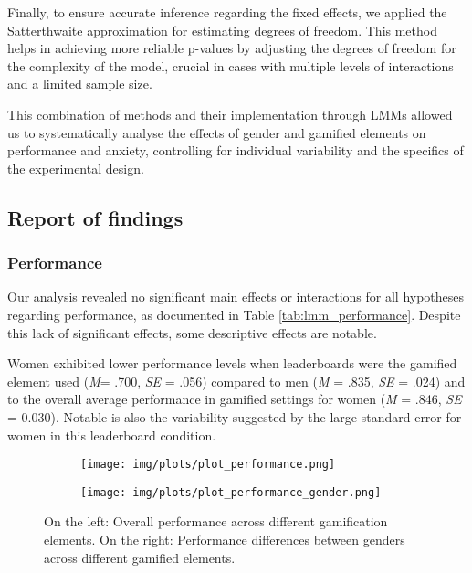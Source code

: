 Finally, to ensure accurate inference regarding the fixed effects, we applied the Satterthwaite approximation for estimating degrees of freedom.
This method helps in achieving more reliable p-values by adjusting the degrees of freedom for the complexity of the model, crucial in cases with multiple levels of interactions and a limited sample size.

This combination of methods and their implementation through LMMs allowed us to systematically analyse the effects of gender and gamified elements on performance and anxiety, controlling for individual variability and the specifics of the experimental design.

\subsection{Report of findings}

\subsubsection{Performance}
Our analysis revealed no significant main effects or interactions for all hypotheses regarding performance, as documented in Table \ref{tab:lmm_performance}.
Despite this lack of significant effects, some descriptive effects are notable.

Women exhibited lower performance levels when leaderboards were the gamified element used (\textit{M}= .700, \textit{SE} = .056) compared to men (\textit{M} = .835, \textit{SE} = .024) and to the overall average performance in gamified settings for women (\textit{M} = .846, \textit{SE} = 0.030).
Notable is also the variability suggested by the large standard error for women in this leaderboard condition.

\begin{figure}[h]
    \centering
    \begin{subfigure}[b]{0.45\textwidth}
        \texttt{[image: img/plots/plot\_performance.png]}
        \label{fig:plot_performance}
    \end{subfigure}
    \hfill
    \begin{subfigure}[b]{0.45\textwidth}
        \texttt{[image: img/plots/plot\_performance\_gender.png]}
        \label{fig:plot_performance_gender}
    \end{subfigure}
    \caption{On the left: Overall performance across different gamification elements. On the right: Performance differences between genders across different gamified elements.}
    \label{fig:performance_comparison}
\end{figure}


